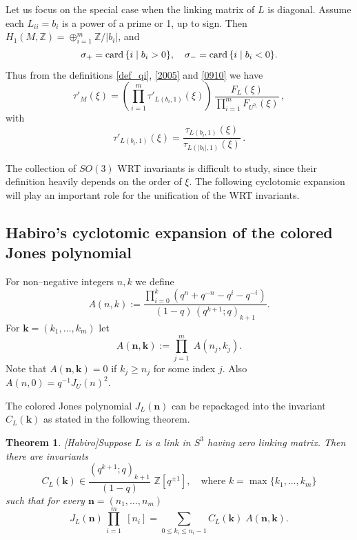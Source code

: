 \documentclass[12pt]{amsart}
\theoremstyle{plain}
\newtheorem{Thm}{Theorem}
\theoremstyle{definition}
\def\BZ{\mathbb Z}
\def\bn{{\mathbf n}}
\def\bj{{\mathbf j}}
\def\Z{\BZ}
\def\bk{\mathbf{k}}
\def\n{{\mathbf n}}
\def\bj{{\mathbf j}}
\begin{document}
Let us focus on the special case when the linking matrix of
$L$ is diagonal.
Assume each $L_{ii}=b_i$ is a power of a prime or 1, up to sign.
Then $H_1(M,\Z) = \oplus_{i=1}^m \Z/|b_i|$, and
$$\sigma_+ = {\rm card}\, \{ i\mid b_i >0\}, \quad \sigma_- =
{\rm card}\, \{ i \mid b_i < 0\}.$$
Thus from the definitions \eqref{def_qi}, \eqref{2005} and \eqref{0910} we have
\begin{equation}
 \tau'_{M}(\xi) = \left( \prod_{i=1}^m  \tau'_{L(b_i,1)}(\xi)
 \right)\,
\frac{F_{L}(\xi)}
{\prod_{i=1}^m F_{U^{b_i}}(\xi) }
\,  ,
\label{0077}
\end{equation}
with
$$\tau'_{L(b_i,1)}(\xi)= \frac{\tau_{L(b_i,1)}(\xi)}{\tau_{L(|b_i|,1)}(\xi)}\, .$$

The collection of $SO(3)$ WRT invariants is difficult to study, since
their definition heavily depends on the order of $\xi$.
The following cyclotomic expansion will play an important role
for the unification of the WRT invariants.


\subsection{Habiro's cyclotomic expansion of the colored Jones
polynomial}
For non--negative integers $n,k$ we define
$$ A(n,k) := \frac{\prod^{k}_{i=0}
\left(q^{n}+q^{-n}-q^i -q^{-i}\right)}{(1-q) \, (q^{k+1};q)_{k+1}}.$$
For $\bk=(k_1,\dots,k_m)$ let
$$ A(\bn,\bk):= \prod_{j=1}^m \; A(n_j,k_j).$$
Note that $A(\bn,\bk)=0$ if $k_j \ge n_j$ for some index $j$. Also
$ A(n,0)= q^{-1} J_U(n)^2.$


The colored Jones polynomial $J_{L}
(\n)$  can be repackaged into the invariant $C_{L}
(\bk)$ as stated in the following theorem.
\begin{Thm} {\rm [Habiro]}\label{GeneralizedHabiro}
 Suppose $L$ is a link in $S^3$ having zero linking matrix.
Then  there are invariants
\begin{equation}\label{Jones2}
C_{L}(\bk) \in \frac{(q^{k+1};q)_{k+1}}{(1-q)}
\,\,\BZ[q^{\pm 1}] ,\quad \text{where  $k=\max\{k_1,\dots, k_m\}$}
\end{equation}
such that for every $\bn =(n_1,\dots, n_m)$
\begin{equation}\label{Jones}
 J_{L}
(\n)  \,  \prod^m_{i=1}\; [n_i] = \sum_{0\le k_i \le n_i-1}
C_{L}(\bk)\;
  A(\bn, \bk).
\end{equation}
\end{Thm}
\end{document}
